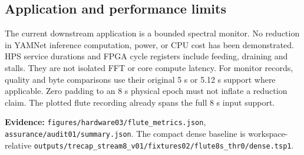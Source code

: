 \documentclass[11pt,letterpaper]{article}
\newcommand{\evidence}[1]{\par{\footnotesize\raggedright\sloppy\color{muted}\textbf{Evidence:} #1\par}}
\newcommand{\epath}[1]{\nolinkurl{#1}}
\begin{document}
\subsection{Application and performance limits}
The current downstream application is a bounded spectral monitor. No reduction in YAMNet inference computation, power, or CPU cost has been demonstrated. HPS service durations and FPGA cycle registers include feeding, draining and stalls. They are not isolated FFT or core compute latency.
For monitor records, quality and byte comparisons use their original 5 s or 5.12 s support where applicable. Zero padding to an 8 s physical epoch must not inflate a reduction claim. The plotted flute recording already spans the full 8 s input support.
\evidence{\epath{figures/hardware03/flute_metrics.json}, \epath{assurance/audit01/summary.json}. The compact dense baseline is workspace-relative \epath{outputs/trecap_stream8_v01/fixtures02/flute8s_thr0/dense.tsp1}.}
\end{document}
